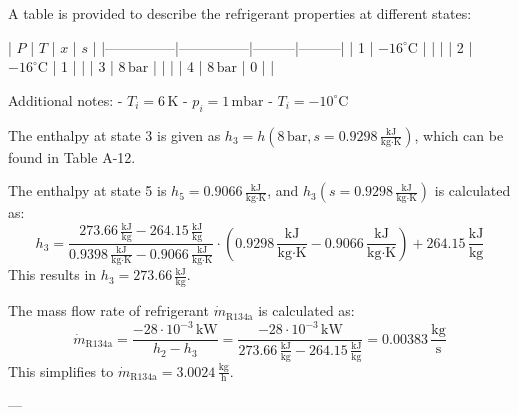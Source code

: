 A table is provided to describe the refrigerant properties at different states:  

| \( P \)       | \( T \)       | \( x \) | \( s \) |  
|---------------|---------------|---------|---------|  
| 1             | \(-16^\circ \text{C}\) |         |         |  
| 2             | \(-16^\circ \text{C}\) | 1       |         |  
| 3             | \( 8 \, \text{bar} \)  |         |         |  
| 4             | \( 8 \, \text{bar} \)  | 0       |         |  

Additional notes:  
- \( T_i = 6 \, \text{K} \)  
- \( p_i = 1 \, \text{mbar} \)  
- \( T_i = -10^\circ \text{C} \)

The enthalpy at state 3 is given as \( h_3 = h(8 \, \text{bar}, s = 0.9298 \, \frac{\text{kJ}}{\text{kg·K}}) \), which can be found in Table A-12.  

The enthalpy at state 5 is \( h_5 = 0.9066 \, \frac{\text{kJ}}{\text{kg·K}} \), and \( h_3(s = 0.9298 \, \frac{\text{kJ}}{\text{kg·K}}) \) is calculated as:  
\[
h_3 = \frac{273.66 \, \frac{\text{kJ}}{\text{kg}} - 264.15 \, \frac{\text{kJ}}{\text{kg}}}{0.9398 \, \frac{\text{kJ}}{\text{kg·K}} - 0.9066 \, \frac{\text{kJ}}{\text{kg·K}}} \cdot (0.9298 \, \frac{\text{kJ}}{\text{kg·K}} - 0.9066 \, \frac{\text{kJ}}{\text{kg·K}}) + 264.15 \, \frac{\text{kJ}}{\text{kg}}  
\]
This results in \( h_3 = 273.66 \, \frac{\text{kJ}}{\text{kg}} \).  

The mass flow rate of refrigerant \( \dot{m}_{\text{R134a}} \) is calculated as:  
\[
\dot{m}_{\text{R134a}} = \frac{-28 \cdot 10^{-3} \, \text{kW}}{h_2 - h_3} = \frac{-28 \cdot 10^{-3} \, \text{kW}}{273.66 \, \frac{\text{kJ}}{\text{kg}} - 264.15 \, \frac{\text{kJ}}{\text{kg}}} = 0.00383 \, \frac{\text{kg}}{\text{s}}
\]
This simplifies to \( \dot{m}_{\text{R134a}} = 3.0024 \, \frac{\text{kg}}{\text{h}} \).  

---